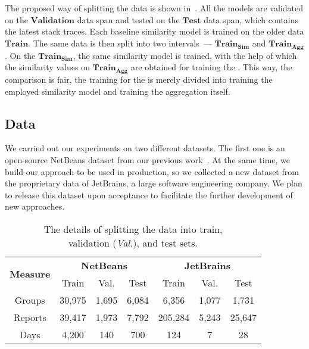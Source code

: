 The proposed way of splitting the data is shown in~.
All the models are validated on the $\mathrm{\textbf{Validation}}$ data span and tested on the $\mathrm{\textbf{Test}}$ data span, which contains the latest stack traces.
Each baseline similarity model is trained on the older data $\mathrm{\textbf{Train}}$.
The same data is then split into two intervals~--- $\mathrm{\textbf{Train}_\textbf{Sim}}$ and $\mathrm{\textbf{Train}_\textbf{Agg}}$.
On the $\mathrm{\textbf{Train}_\textbf{Sim}}$, the same similarity model is trained, with the help of which the similarity values on $\mathrm{\textbf{Train}_\textbf{Agg}}$ are obtained for training the \ag.
This way, the comparison is fair, the training for the \ag is merely divided into training the employed similarity model and training the aggregation itself.

\subsection{Data}

We carried out our experiments on two different datasets.
The first one is an open-source NetBeans dataset from our previous work~\cite{s3m}.
At the same time, we build our approach to be used in production, so we collected a new dataset from the proprietary data of JetBrains, a large software engineering company.
We plan to release this dataset upon acceptance to facilitate the further development of new approaches. 

\begin{table}[h]
\centering
\caption{The details of splitting the data into train, \\ validation (\textit{Val.}), and test sets.}
\begin{tabular}{ccccccc}
\toprule
\multirow{2}{*}{\textbf{Measure}} & 
\multicolumn{3}{c}{\textbf{NetBeans}} & \multicolumn{3}{c}{\textbf{JetBrains}}
\\ \cmidrule(lr){2-4}\cmidrule(lr){5-7} 
& \multicolumn{1}{c}{Train} & \multicolumn{1}{c}{Val.} & \multicolumn{1}{c}{Test} & \multicolumn{1}{c}{Train} & \multicolumn{1}{c}{Val.} & \multicolumn{1}{c}{Test} 

\\ \midrule

Groups &
30,975 & 1,695 & 6,084 & 6,356 & 1,077 & 1,731                          
\\ 

Reports & 
39,417 & 1,973 & 7,792 & 205,284 & 5,243 & 25,647                         
\\ 

Days & 
4,200 & 140 & 700 & 124 & 7 & 28                          
\\ \bottomrule
\end{tabular}


\label{tab:datasets}

\end{table}

